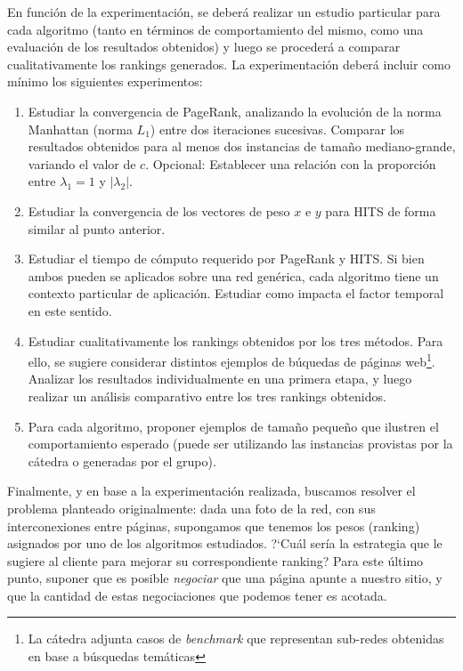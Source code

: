 En funci\'on de la experimentaci\'on, se deber\'a realizar un estudio particular para cada algoritmo (tanto en t\'erminos de comportamiento
del mismo, como una evaluaci\'on de los resultados obtenidos) y luego se proceder\'a a comparar cualitativamente los rankings generados.
La experimentaci\'on deber\'a incluir como m\'inimo los siguientes experimentos:
\begin{enumerate}
\item Estudiar la convergencia de PageRank, analizando la evoluci\'on de la norma Manhattan (norma $L_1$) entre dos iteraciones sucesivas. Comparar
los resultados obtenidos para al menos dos instancias de tama\~no mediano-grande, variando el valor de $c$. Opcional: Establecer una relaci\'on 
con la proporci\'on entre $\lambda_1 = 1$ y $|\lambda_2|$.
\item Estudiar la convergencia de los vectores de peso $x$ e $y$ para HITS de forma similar al punto anterior.
\item Estudiar el tiempo de c\'omputo requerido por PageRank y HITS. Si bien ambos pueden se aplicados sobre una red gen\'erica, cada algoritmo 
tiene un contexto particular de aplicaci\'on. Estudiar como impacta el factor temporal en este sentido.
\item Estudiar cualitativamente los rankings obtenidos por los tres m\'etodos. Para ello, se sugiere considerar distintos ejemplos de b\'uquedas
de p\'aginas web\footnote{La c\'atedra adjunta casos de \emph{benchmark} que representan sub-redes obtenidas en base a b\'usquedas tem\'aticas}.
Analizar los resultados individualmente en una primera etapa, y luego realizar un an\'alisis comparativo entre los tres rankings obtenidos.
\item Para cada algoritmo, proponer ejemplos de tama\~no peque\~no que ilustren el comportamiento esperado (puede ser utilizando las instancias
provistas por la c\'atedra o generadas por el grupo).
\end{enumerate}

Finalmente, y en base a la experimentaci\'on realizada, buscamos resolver el problema planteado originalmente: dada una foto de la red, con sus
interconexiones entre p\'aginas, supongamos que tenemos los pesos (ranking) asignados por uno de los algoritmos estudiados. ?`Cu\'al ser\'ia la
estrategia que le sugiere al cliente para mejorar su correspondiente ranking? Para este \'ultimo punto, suponer que es posible \emph{negociar}
que una p\'agina apunte a nuestro sitio, y que la cantidad de estas negociaciones que podemos tener es acotada.

